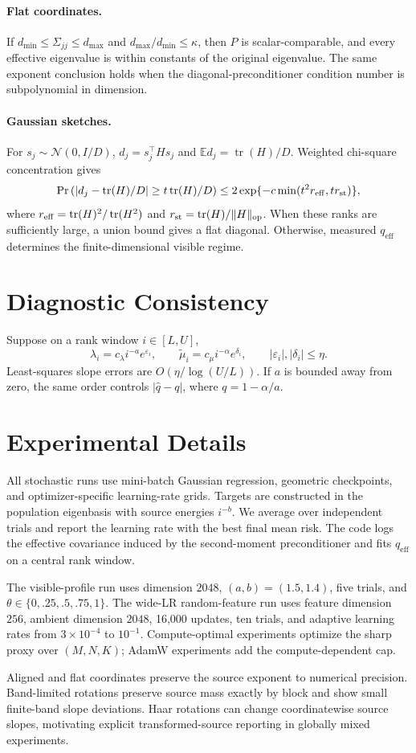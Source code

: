 \documentclass[letterpaper]{article}
\newcommand{\E}{\mathbb{E}}
\newcommand{\tr}{\operatorname{tr}}
\newcommand{\qeff}{q_{\mathrm{eff}}}
\begin{document}
\paragraph{Flat coordinates.}
If $d_{\min}\le\Sigma_{jj}\le d_{\max}$ and $d_{\max}/d_{\min}\le\kappa$, then $P$ is scalar-comparable, and every effective eigenvalue is within constants of the original eigenvalue.  The same exponent conclusion holds when the diagonal-preconditioner condition number is subpolynomial in dimension.

\paragraph{Gaussian sketches.}
For $s_j\sim\mathcal N(0,I/D)$, $d_j=s_j^\top Hs_j$ and $\E d_j=\tr(H)/D$.  Weighted chi-square concentration gives
\[
 \Pr\left(|d_j-\tr(H)/D|\ge t\tr(H)/D\right)
 \le2\exp\{-c\min(t^2r_{\rm eff},tr_{\rm st})\},
\]
where $r_{\rm eff}=\tr(H)^2/\tr(H^2)$ and $r_{\rm st}=\tr(H)/\|H\|_{\rm op}$.  When these ranks are sufficiently large, a union bound gives a flat diagonal.  Otherwise, measured $\qeff$ determines the finite-dimensional visible regime.

\section{Diagnostic Consistency}

Suppose on a rank window $i\in[L,U]$,
\[
 \lambda_i=c_\lambda i^{-a}e^{\varepsilon_i},
 \qquad
 \widetilde\mu_i=c_\mu i^{-\alpha}e^{\delta_i},
 \qquad |\varepsilon_i|,|\delta_i|\le\eta.
\]
Least-squares slope errors are $O(\eta/\log(U/L))$.  If $a$ is bounded away from zero, the same order controls $|\widehat q-q|$, where $q=1-\alpha/a$.

\section{Experimental Details}

All stochastic runs use mini-batch Gaussian regression, geometric checkpoints, and optimizer-specific learning-rate grids.  Targets are constructed in the population eigenbasis with source energies $i^{-b}$.  We average over independent trials and report the learning rate with the best final mean risk.  The code logs the effective covariance induced by the second-moment preconditioner and fits $\qeff$ on a central rank window.

The visible-profile run uses dimension $2048$, $(a,b)=(1.5,1.4)$, five trials, and $\theta\in\{0,.25,.5,.75,1\}$.  The wide-LR random-feature run uses feature dimension $256$, ambient dimension $2048$, 16,000 updates, ten trials, and adaptive learning rates from $3\times10^{-4}$ to $10^{-1}$.  Compute-optimal experiments optimize the sharp proxy over $(M,N,K)$; AdamW experiments add the compute-dependent cap.

Aligned and flat coordinates preserve the source exponent to numerical precision.  Band-limited rotations preserve source mass exactly by block and show small finite-band slope deviations.  Haar rotations can change coordinatewise source slopes, motivating explicit transformed-source reporting in globally mixed experiments.


\end{document}
